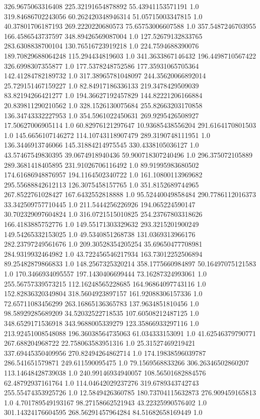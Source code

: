 326.9675063316408	225.32191654878892	55.43941153571191	1.0
319.84686702243056	60.262420348946314	51.05715003347815	1.0
40.37801706187193	269.2220220680573	75.65753006607588	1.0
357.5487246703955	166.4586543737597	348.89426569087004	1.0
127.52679132833765	283.6308838700104	130.76516723919218	1.0
224.7594688390076	189.70829688064248	115.294434819603	1.0
341.3633867146432	196.4498710567422	326.6998307355877	1.0
177.5378248752586	177.35931065705364	142.41284782189732	1.0
317.38965781048097	244.35620066892014	25.729151467159227	1.0
82.84917186336133	219.3478429509039	83.82194266421277	1.0
194.36627192457829	144.82221206166884	20.839811290210562	1.0
328.1526130075684	255.82663203170858	136.34743332227953	1.0
354.5961022450631	269.9295426508927	17.50627006905114	1.0
60.82976121297647	10.93685438556204	291.6164170801503	1.0
145.6656107146272	114.10743118907479	289.3190748111951	1.0
136.3446913746066	145.31884214975545	330.4338105036127	1.0
43.57467549830395	39.0674918940436	59.900718307240496	1.0
296.375072105889	289.3681418405895	231.91026706116492	1.0
89.91995983680502	174.61686948876957	194.1164502340722	1.0
161.10800113969682	295.55688842612113	126.3075458157765	1.0
351.8152689744965	267.8522761028427	167.6432552818888	1.0
95.52440049858484	290.7786112016373	33.342509757710445	1.0
211.5444256226926	194.065224590147	30.702329097604824	1.0
316.0721515010825	254.23767803318626	166.4183885752776	1.0
149.55171303329632	293.3215201900249	149.54265332153025	1.0
49.5340851268738	131.0369313966176	282.23797249561676	1.0
209.30528354205254	35.69650477708981	284.9319932464982	1.0
43.722456546217934	163.73012252506894	89.25482879866833	1.0
148.2567325320214	358.1775660984897	50.16497075121583	1.0
170.3466934095557	197.1430406699444	73.16287324993061	1.0
255.56757339573215	112.16248565228685	164.96864097743116	1.0
152.82836320349804	318.5604923897157	161.92088306157336	1.0
72.65711083456299	263.16865136365783	137.9634851810456	1.0
98.58929285689209	34.52032522718535	107.60508212487125	1.0
348.6529171536918	343.9688005339279	123.35866933297116	1.0
213.92451008548088	196.36038564735063	61.034333153091	1.0
41.62546379790771	267.688204968722	22.758063583951316	1.0
25.31527469219421	337.69445350409956	270.82494264862714	1.0
174.19838596039787	286.541651579871	249.611590095475	1.0
79.1569568833266	306.26346502860207	113.14648428739038	1.0
240.99146934940057	108.56501682884576	62.48792937161764	1.0
114.04642029237276	319.6789343742743	255.55474353925726	1.0
12.5849426360785	180.73704115632873	276.909459165813	1.0
4.701789549193167	98.27158662521943	43.22325990576402	1.0
301.14324176604595	268.56291457964284	84.51682658169449	1.0
